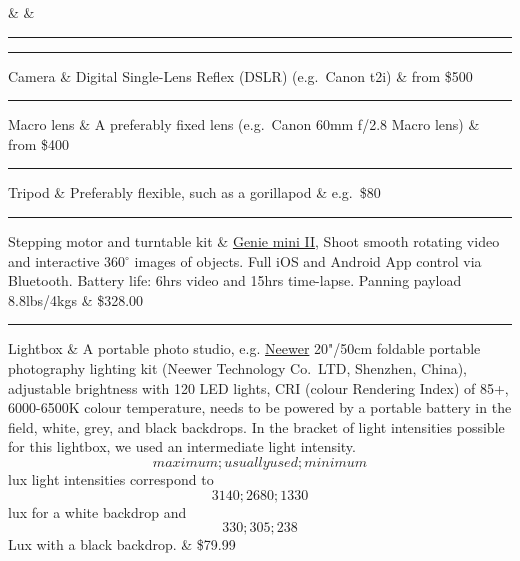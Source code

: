 \documentclass[
]{book}
\theoremstyle{definition}
\theoremstyle{definition}
\theoremstyle{definition}
\theoremstyle{definition}
\theoremstyle{remark}
\begin{document}
\& \&\\

\begin{center}\rule{0.5\linewidth}{0.5pt}\end{center}

\hfill\break

\begin{center}\rule{0.5\linewidth}{0.5pt}\end{center}

Camera \& Digital Single-Lens Reflex (DSLR) (e.g.~Canon t2i) \& from
\$500\\

\begin{center}\rule{0.5\linewidth}{0.5pt}\end{center}

Macro lens \& A preferably fixed lens (e.g.~Canon 60mm f/2.8 Macro lens)
\& from \$400\\

\begin{center}\rule{0.5\linewidth}{0.5pt}\end{center}

Tripod \& Preferably flexible, such as a gorillapod \& e.g.~\$80\\

\begin{center}\rule{0.5\linewidth}{0.5pt}\end{center}

Stepping motor and turntable kit \& \href{https://www.bhphotovideo.com/c/product/1486043-REG/syrp_sykit_0043_genie_mini_ii_turntable.html/quick-compare}{Genie mini
II},
Shoot smooth rotating video and interactive 360\({^\circ}\) images of
objects. Full iOS and Android App control via Bluetooth. Battery life:
6hrs video and 15hrs time-lapse. Panning payload 8.8lbs/4kgs \& \$328.00\\

\begin{center}\rule{0.5\linewidth}{0.5pt}\end{center}

Lightbox \& A portable photo studio, e.g.
\href{https://neewer.com/products/lighting-studio-10094456?_pos=2\&_sid=bde9f6ddb\&_ss=r}{Neewer}
20"/50cm foldable portable photography lighting kit (Neewer Technology
Co.~LTD, Shenzhen, China), adjustable brightness with 120 LED lights,
CRI (colour Rendering Index) of 85+, 6000-6500K colour temperature,
needs to be powered by a portable battery in the field, white, grey, and
black backdrops. In the bracket of light intensities possible for this
lightbox, we used an intermediate light intensity. \[maximum;usually
used; minimum\] lux light intensities correspond to \[3140;2680;1330\]
lux for a white backdrop and \[330;305;238\] Lux with a black backdrop.
\& \$79.99\\
\end{document}
